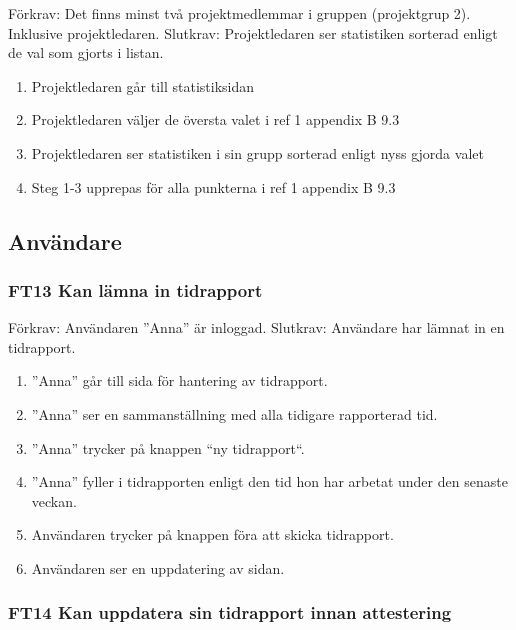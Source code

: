 \documentclass[paper=a4, fontsize=11pt,twoside]{article}
\begin{document}
		Förkrav: Det finns minst två projektmedlemmar i gruppen (projektgrup 2).
		Inklusive projektledaren.
		\newline
		Slutkrav: Projektledaren ser statistiken sorterad enligt de val som gjorts i listan.
		\begin{enumerate}
		\item Projektledaren går till statistiksidan
		\item Projektledaren väljer de översta valet i ref 1 appendix B 9.3
		\item Projektledaren ser statistiken i sin grupp sorterad enligt nyss gjorda
		valet 
		\item Steg 1-3 upprepas för alla punkterna i ref 1 appendix B 9.3
		
		\end{enumerate}		
		
		\subsection{Användare}
		
		\subsubsection*{FT13 Kan lämna in tidrapport}
		
		Förkrav: Användaren ”Anna” är inloggad.
		\newline 
		Slutkrav: Användare har lämnat in en tidrapport.
		
		\begin{enumerate}
		  \item ”Anna” går till sida för hantering av tidrapport.
			\item ”Anna” ser en sammanställning med alla tidigare rapporterad tid.
			\item ”Anna” trycker på knappen “ny tidrapport“.
			\item ”Anna” fyller i tidrapporten enligt den tid hon har arbetat under den
			senaste veckan.
			\item Användaren trycker på knappen föra att skicka
			tidrapport.
			\item Användaren ser en uppdatering av sidan.
		  
		\end{enumerate}
		
		\subsubsection*{FT14 Kan uppdatera sin tidrapport innan attestering}
		
\end{document}
